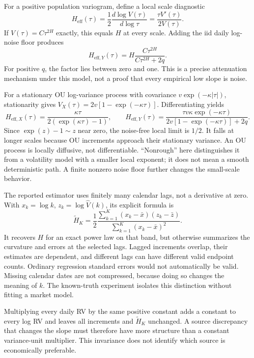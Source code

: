 For a positive population variogram, define a local scale diagnostic
\begin{equation}
 H_{\mathrm{eff}}(\tau)=\frac12\frac{d\log V(\tau)}{d\log\tau}
 =\frac{\tau V'(\tau)}{2V(\tau)}.
\end{equation}
If $V(\tau)=C\tau^{2H}$ exactly, this equals $H$ at every scale. Adding the iid daily log-noise floor produces
\begin{equation}
 H_{\mathrm{eff},Y}(\tau)
 =H\frac{C\tau^{2H}}{C\tau^{2H}+2q}.
\end{equation}
For positive $q$, the factor lies between zero and one. This is a precise attenuation mechanism under this model, not a proof that every empirical low slope is noise.

For a stationary OU log-variance process with covariance $v\exp(-\kappa|\tau|)$, stationarity gives $V_X(\tau)=2v[1-\exp(-\kappa\tau)]$. Differentiating yields
\begin{equation}
 H_{\mathrm{eff},X}(\tau)=\frac{\kappa\tau}{2(\exp(\kappa\tau)-1)},\qquad
 H_{\mathrm{eff},Y}(\tau)=
 \frac{\tau v\kappa\exp(-\kappa\tau)}{2v[1-\exp(-\kappa\tau)]+2q}.
\end{equation}
Since $\exp(z)-1\sim z$ near zero, the noise-free local limit is $1/2$. It falls at longer scales because OU increments approach their stationary variance. An OU process is locally diffusive, not differentiable. ``Nonrough'' here distinguishes it from a volatility model with a smaller local exponent; it does not mean a smooth deterministic path. A finite nonzero noise floor further changes the small-scale behavior.

The reported estimator uses finitely many calendar lags, not a derivative at zero. With $x_k=\log k$, $z_k=\log\widehat V(k)$, its explicit formula is
\begin{equation}
 \widetilde H_K=\frac12
 \frac{\sum_{k=1}^{K}(x_k-\bar x)(z_k-\bar z)}{\sum_{k=1}^{K}(x_k-\bar x)^2}.
\end{equation}
It recovers $H$ for an exact power law on that band, but otherwise summarizes the curvature and errors at the selected lags. Lagged increments overlap, their estimates are dependent, and different lags can have different valid endpoint counts. Ordinary regression standard errors would not automatically be valid. Missing calendar dates are not compressed, because doing so changes the meaning of $k$. The known-truth experiment isolates this distinction without fitting a market model.

Multiplying every daily RV by the same positive constant adds a constant to every log RV and leaves all increments and $\widetilde H_K$ unchanged. A source discrepancy that changes the slope must therefore have more structure than a constant variance-unit multiplier. This invariance does not identify which source is economically preferable.

